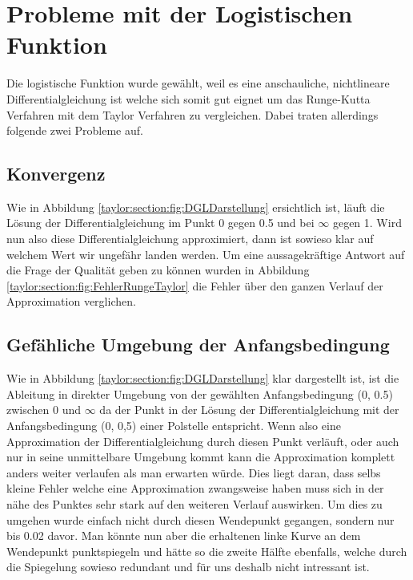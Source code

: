 \section{Probleme mit der Logistischen Funktion}
\label{taylor:subsection:Probleme}
Die logistische Funktion wurde gewählt, weil es eine anschauliche, nichtlineare Differentialgleichung ist welche sich somit gut eignet um das Runge-Kutta Verfahren mit dem Taylor Verfahren zu vergleichen.
Dabei traten allerdings folgende zwei Probleme auf.

\subsection{Konvergenz}
\label{taylor:subsection:Konvergenz}
Wie in Abbildung 
\ref{taylor:section:fig:DGLDarstellung}
ersichtlich ist, läuft die Lösung der Differentialgleichung im Punkt 0 gegen 0.5 und bei $\infty$ gegen 1.
Wird nun also diese Differentialgleichung approximiert, dann ist sowieso klar auf welchem Wert wir ungefähr landen werden.
Um eine aussagekräftige Antwort auf die Frage der Qualität geben zu können wurden in Abbildung \ref{taylor:section:fig:FehlerRungeTaylor} die Fehler über den ganzen Verlauf der Approximation verglichen.

\subsection{Gefähliche Umgebung der Anfangsbedingung}
\label{taylor:subsection:0Punkt}
Wie in Abbildung 
\ref{taylor:section:fig:DGLDarstellung}
klar dargestellt ist, ist die Ableitung in direkter Umgebung von der gewählten Anfangsbedingung (0, 0.5) zwischen 0 und $\infty$ da der Punkt in der Lösung der Differentialgleichung mit der Anfangsbedingung (0, 0,5) einer Polstelle entspricht.
Wenn also eine Approximation der Differentialgleichung durch diesen Punkt verläuft, oder auch nur in seine unmittelbare Umgebung kommt kann die Approximation komplett anders weiter verlaufen als man erwarten würde.
Dies liegt daran, dass selbs kleine Fehler welche eine Approximation zwangsweise haben muss sich in der nähe des Punktes sehr stark auf den weiteren Verlauf auswirken.
Um dies zu umgehen wurde einfach nicht durch diesen Wendepunkt gegangen, sondern nur bis 0.02 davor.
Man könnte nun aber die erhaltenen linke Kurve an dem Wendepunkt punktspiegeln und hätte so die zweite Hälfte ebenfalls, welche durch die Spiegelung sowieso redundant und für uns deshalb nicht intressant ist.



